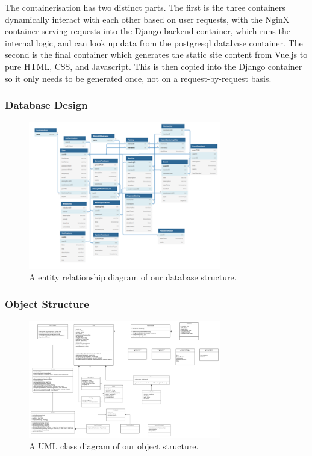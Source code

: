 \documentclass[10pt]{article}
\begin{document}
The containerisation has two distinct parts. The first is the three containers
dynamically interact with each other based on user requests, with the NginX
container serving requests into the Django backend container, which runs the
internal logic, and can look up data from the postgresql database container. The
second is the final container which generates the static site content from
Vue.js to pure HTML, CSS, and Javascript. This is then copied into the Django
container so it only needs to be generated once, not on a request-by-request
basis.

\subsubsection{Database Design}

\begin{figure}[H]
    \centering
    \includegraphics[width=0.75\textwidth]{DB}
    \caption{A entity relationship diagram of our database structure.}
    \label{fig:entity_relationship_diagram}
\end{figure}


\subsubsection{Object Structure}

\begin{figure}[H]
    \centering
    \includegraphics[width=0.75\textwidth]{Objects}
    \caption{A UML class diagram of our object structure.}
    \label{fig:uml_class_diagram}
\end{figure}
\end{document}
